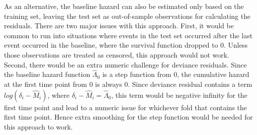 As an alternative, the baseline hazard can also be estimated only based on the training set, leaving the test set as out-of-sample observations for calculating the residuals. There are two major issues with this approach. First, it would be common to run into situations where events in the test set occurred after the last event occurred in the baseline, where the survival function dropped to 0. Unless those observations are treated as censored, this approach would not work. Second, there would be an extra numeric challenge for deviance residuals. Since the baseline hazard function $\hat{\Lambda}_{0}$ is a step function from 0, the cumulative hazard at the first time point from 0 is always 0. Since deviance residual contains a term $log(\delta_{i} - \hat{M}_{i})$, where $\delta_{i} - \hat{M}_{i} = \hat{\Lambda}_{0}$, this term would be negative infinity for the first time point and lead to a numeric issue for whichever fold that contains the first time point. Hence extra smoothing for the step function would be needed for this approach to work.


